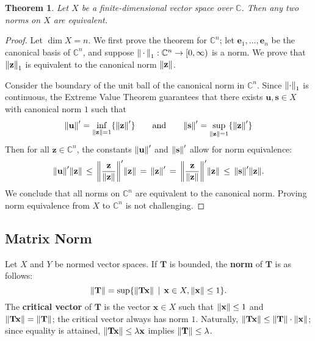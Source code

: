 \documentclass[11pt]{article}
\renewcommand{\vec}[1]{\mathbf{#1}}
\newcommand{\mat}[1]{\mathbf{#1}}
\newtheorem{theorem}{Theorem}
\begin{document}
\begin{theorem}
  Let $X$ be a finite-dimensional vector space over $\mathbb{C}$. Then any two norms on $X$ are equivalent.
\end{theorem}
\begin{adjustwidth}{0.5cm}{}
  \begin{proof}
    Let $\dim X = n$. We first prove the theorem for $\mathbb{C}^{n}$; let $\vec{e}_{1}, \ldots, \vec{e}_{n}$ be the canonical basis of $\mathbb{C}^{n}$, and suppose $\norm{\, \cdot \,}_{1} : \mathbb{C}^{n} \to [0, \infty)$ is a norm. We prove that $\norm{\vec{z}}_{1}$ is equivalent to the canonical norm $\norm{\vec{z}}$.
    
    Consider the boundary of the unit ball of the canonical norm in $\mathbb{C}^{n}$. Since $\norm{\cdot}_{1}$ is continuous, the Extreme Value Theorem guarantees that there exists $\vec{u}, \vec{s} \in X$ with canonical norm $1$ such that 
    \[
      \norm{\vec{u}}' = \inf\limits_{\norm{\vec{z}} = 1} \{  \norm{\vec{z}}' \} \qquad \text{and} \qquad \norm{\vec{s}}' = \sup\limits_{\norm{\vec{z}} = 1} \{ \norm{\vec{z}}' \}
    \]
    Then for all $\vec{z} \in \mathbb{C}^{n}$, the constants $\norm{\vec{u}}'$ and $\norm{\vec{s}}'$ allow for norm equivalence:
    \[
      \norm{\vec{u}}' \norm{\vec{z}} \, \le \, \norm{\frac{\vec{z}}{\norm{\vec{z}}}}' \norm{\vec{z}} \, = \, \norm{\vec{z}}' \, = \, \norm{\frac{\vec{z}}{\norm{\vec{z}}}}' \norm{\vec{z}} \, \le \, \norm{\vec{s}}' \norm{\vec{z}}.
    \]
    We conclude that all norms on $\mathbb{C}^{n}$ are equivalent to the canonical norm. Proving norm equivalence from $X$ to $\mathbb{C}^{n}$ is not challenging.
  \end{proof}
\end{adjustwidth}


\subsection{Matrix Norm}

Let $X$ and $Y$ be normed vector spaces. If $\mat{T}$ is bounded, the \textbf{norm} of $\mat{T}$ is as follows:
\[
	\norm{\mat{T}} = \sup \{ \norm{\mat{T} \vec{x}} \, \mid \, \vec{x} \in X, \norm{\vec{x}} \le 1\}.
\]
The \textbf{critical vector} of $\mat{T}$ is the vector $\vec{x} \in X$ such that $\norm{\vec{x}} \le 1$ and $\norm{\mat{T} \vec{x}} = \norm{\mat{T}}$; the critical vector always has norm $1$. Naturally, $\norm{\mat{T} \vec{x}} \le \norm{\mat{T}} \cdot \norm{\vec{x}}$; since equality is attained, $\norm{\mat{T} \vec{x}} \le \lambda \vec{x}$ implies $\norm{\vec{T}} \le \lambda$.
\end{document}
